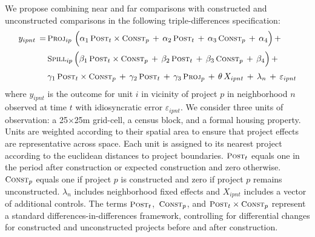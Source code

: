 \documentclass[12pt]{article}
\begin{document}
We propose combining near and far comparisons with constructed and unconstructed comparisons in the following triple-differences specification:
\begin{align}\label{eq:main}
\begin{split}
\quad y_{ipnt} \, =& \,   \textsc{\small Proj}_{ip} \,\, \Big( \alpha_1 \, \textsc{\small Post}_{t}\times\textsc{\small Const}_{p} \, + \, \alpha_2 \, \textsc{\small Post}_{t} \, + \, \alpha_3 \, \textsc{\small Const}_{p}\, +\, \alpha_4 \Big) \, + \\[.2em]
& \, \textsc{\small Spill}_{ip} \, \Big( \beta_1 \, \textsc{\small Post}_{t}\times\textsc{\small Const}_{p} \, + \, \beta_2 \, \textsc{\small Post}_{t} \, + \, \beta_3 \, \textsc{\small Const}_{p} \, +\, \beta_4 \Big) \, + \\[.2em]
& \, \gamma_1 \,  \textsc{\small Post}_{t}\times\textsc{\small Const}_{p} \, + \, \gamma_2 \,\textsc{\small Post}_{t} \, + \, \gamma_3 \,  \textsc{\small Proj}_{p} \, + \, \theta \, X_{ipnt} \, + \, \lambda_n \, + \, \varepsilon_{ipnt} \quad 
\end{split}
\end{align} %
\noindent where $y_{ipnt}$ is the outcome for unit $i$ in vicinity of project $p$ in neighborhood $n$ observed at time $t$ with idiosyncratic error $\varepsilon_{ipnt}$.  We consider three units of observation: a 25$\times$25m grid-cell, a census block, and a formal housing property.  Units are weighted according to their spatial area to ensure that project effects are representative across space.  Each unit is assigned to its nearest project according to the euclidean distances to project boundaries.  $\textsc{\small Post}_{t}$ equals one in the period after construction or expected construction and zero otherwise.  $\textsc{\small Const}_{p}$ equals one if project $p$ is constructed and zero if project $p$ remains unconstructed.  $\lambda_{n}$ includes neighborhood fixed effects and $X_{ipnt}$ includes a vector of additional controls.  The terms $\textsc{\small Post}_{t}$, $\,\textsc{\small Const}_{p}$, and $\textsc{\small Post}_{t}\times\textsc{\small Const}_{p}$ represent a standard differences-in-differences framework, controlling for differential changes for constructed and unconstructed projects before and after construction.  
\end{document}
